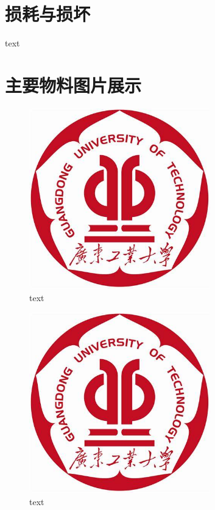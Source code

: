 \section{损耗与损坏}
text

\section{主要物料图片展示}
\begin{figure}[h]
    \centering
    \includegraphics[width=0.7\textwidth]{figures/logo.png}
    \caption{text}
\end{figure}

\begin{figure}[h]
    \centering
    \includegraphics[width=0.7\textwidth]{figures/logo.png}
    \caption{text}
\end{figure}

